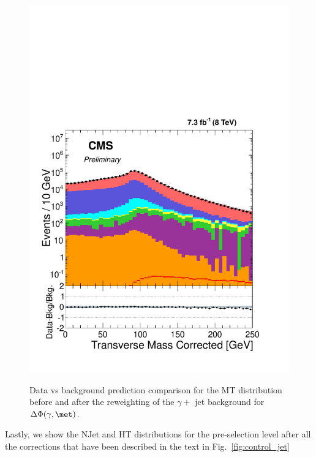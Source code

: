 \begin{figure}[!hp]
{\label{fig:mt_a}\includegraphics[scale=0.4]{analysis_figs/mt_a.pdf}}
\caption{ Data vs background prediction comparison for the MT distribution before and after the reweighting of the  $\gamma + $ jet background for $\Delta \Phi (\gamma, \met)$.}
\label{fig:MT}
\end{figure}

Lastly, we show the NJet and HT distributions for the pre-selection level after all the corrections that have been described in the text in Fig.~\ref{fig:control_jet}

